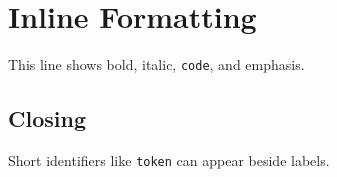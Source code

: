 \documentclass{article}
\def\textbf#1{#1}
\def\textit#1{#1}
\def\emph#1{#1}
\begin{document}
\section{Inline Formatting}
This line shows \textbf{bold}, \textit{italic}, \texttt{code}, and \emph{emphasis}.

\subsection{Closing}
Short identifiers like \texttt{token} can appear beside \textbf{labels}.
\end{document}
